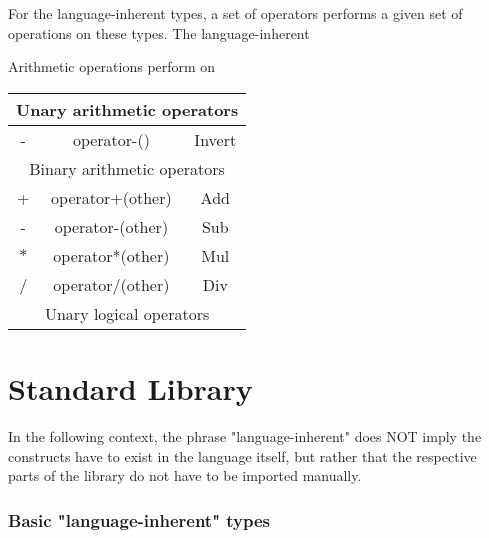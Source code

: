 \documentclass{scrartcl}
\begin{document}
For the language-inherent types, a set of operators performs a given set of operations on these types. The language-inherent 

Arithmetic operations perform on 

\begin{table}[H]
    \centering
    \begin{tabular}{c|c|c}
    \multicolumn{3}{c}{Unary arithmetic operators} \\ \hline
        - & operator-()         & Invert \\ \hline
    \multicolumn{3}{c}{Binary arithmetic operators} \\ \hline
        + & operator+(other)    & Add \\
        - & operator-(other)    & Sub \\
        $*$ & operator*(other)  & Mul \\
        / & operator/(other)    & Div \\
    \multicolumn{3}{c}{Unary logical operators} \\ \hline
        
    \end{tabular}
\end{table}


\part{Standard Library}

In the following context, the phrase "language-inherent" does NOT imply the constructs have to exist in the language itself, but rather that the respective parts of the library do not have to be imported manually.

\section{Basic "language-inherent" types}
\end{document}
